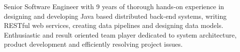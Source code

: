 
\par{
Senior Software Engineer with 9 years of thorough hands-on experience in designing and developing Java based distributed back-end
systems, writing RESTful web services, creating data pipelines and designing data models. Enthusiastic and result oriented team player
dedicated to system architecture, product development and efficiently resolving project issues.
}
\vspace{1em}